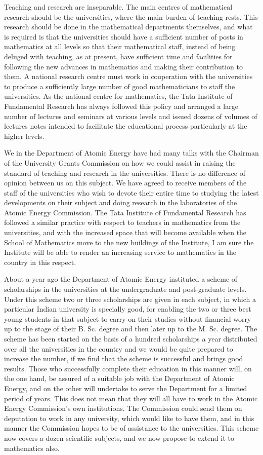 Teaching and research are inseparable. The main centres of
mathematical research should be the universities, where the main
burden of teaching rests. This research should be done in the
mathematical departments themselves, and what is required is that the
universities should have a sufficient number of posts in mathematics
at all levels so that their mathematical staff, instead of being
deluged with teaching, as at present, have sufficient time and
facilities for following the new advances in mathematics and making
their contribution to them. A national research centre must work in
cooperation with the universities to produce a sufficiently large
number of good mathematicians to staff the universities. As the
national centre for mathematics, the Tata Institute of Fundamental
Research has always followed this policy and arranged a large number
of lectures and seminars at various levels and issued dozens of
volumes of lectures notes intended to facilitate the educational
process particularly at the higher levels.

We in the Department of Atomic Energy have had many talks with the
Chairman of the University Grants Commission on how we could assist in
raising the standard of teaching and research in the
universities. There is no difference of opinion between us on this
subject. We have agreed to receive members of the staff of the
universities who wish to devote their entire time to studying the
latest developments on their subject and doing research in the
laboratories of the Atomic Energy Commission. The Tata Institute of
Fundamental Research has followed a similar practice with respect to
teachers in mathematics from the universities, and with the increased
space that will become available when the School of Mathematics move
to the new buildings of the Institute, I am sure the Institute will be
able to render an increasing service to mathematics in the country in
this respect. 

About a year ago the Department of Atomic Energy instituted a scheme
of scholarships in the universities at the undergraduate and
post-graduate levels. Under this scheme two or three scholarships are
given in each subject, in which a particular Indian university is
specially good, for enabling the two or three best young students in
that subject to carry on their studies without financial worry up to
the stage of their B. Sc. degree and then later up to the
M. Sc. degree. The scheme has been started on the basis of a hundred
scholarships a year distributed over all the universities in the
country and we would be quite prepared to increase the number, if we
find that the scheme is successful and brings good results. Those who
successfully complete their education in this manner will, on the one
hand, be assured of a suitable job with the Department of Atomic
Energy, and on the other will undertake to serve the Department for a
limited period of years. This does not mean that they will all have to
work in the Atomic Energy Commission's own institutions. The
Commission could send them on deputation to work in any university,
which would like to have them, and in this manner the Commission hopes
to be of assistance to the universities. This scheme now covers a
dozen scientific subjects, and we now propose to extend it to
mathematics also.

